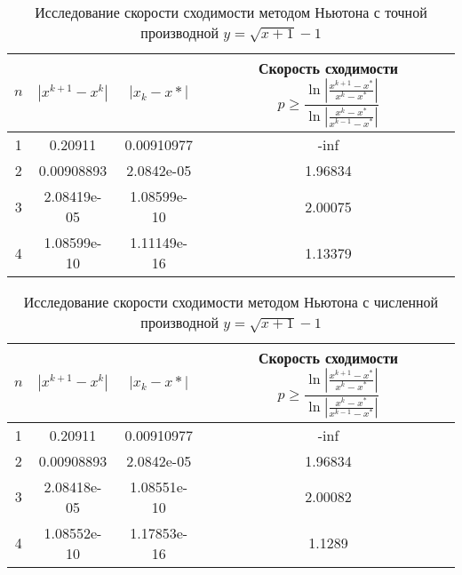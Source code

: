 \documentclass{article}
\begin{document}
    \begin{table}[H]
        \centering
        \caption{Исследование скорости сходимости методом Ньютона с точной производной \mbox{$y = \sqrt{x+1} - 1$}}
        \begin{tabular}{|c|c|c|c|}
            \hline
            $n$ & $|x^{k+1} - x^k|$ & $ |x_k - x*|$ & Скорость сходимости $p \geqslant \dfrac{\ln | \frac{x^{k+1}-x^*}{x^k - x^*} |}{\ln |\frac{x^k -x^*}{x^{k-1} - x^*}|}$ \\
            \hline 
            1 & 0.20911 & 0.00910977 & -inf \\ \hline
            2 & 0.00908893 & 2.0842e-05 & 1.96834 \\ \hline
            3 & 2.08419e-05 & 1.08599e-10 & 2.00075 \\ \hline
            4 & 1.08599e-10 & 1.11149e-16 & 1.13379 \\ \hline
        \end{tabular}
    \end{table}
    \begin{table}[H]
        \centering
        \caption{Исследование скорости сходимости методом Ньютона с численной производной \mbox{$y = \sqrt{x+1} - 1$}}
        \begin{tabular}{|c|c|c|c|}
            \hline
            $n$ & $|x^{k+1} - x^k|$ & $ |x_k - x*|$ & Скорость сходимости $p \geqslant \dfrac{\ln | \frac{x^{k+1}-x^*}{x^k - x^*} |}{\ln |\frac{x^k -x^*}{x^{k-1} - x^*}|}$ \\
            \hline 
            1 & 0.20911 & 0.00910977 & -inf \\ \hline
            2 & 0.00908893 & 2.0842e-05 & 1.96834 \\ \hline
            3 & 2.08418e-05 & 1.08551e-10 & 2.00082 \\ \hline
            4 & 1.08552e-10 & 1.17853e-16 & 1.1289 \\ \hline
        \end{tabular}
    \end{table}
\end{document}
